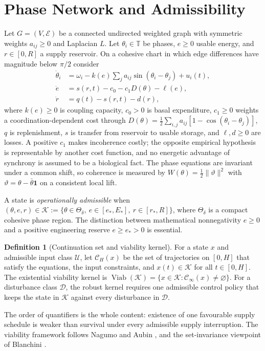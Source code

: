 \documentclass[11pt,notitlepage]{report}
\theoremstyle{definition}
\newtheorem{definition}[theorem]{Definition}
\theoremstyle{remark}
\newcommand{\K}{\mathcal K}
\newcommand{\one}{\mathbf 1}
\begin{document}
\section{Phase Network and Admissibility}
Let $G=(V,\mathcal E)$ be a connected undirected weighted graph with symmetric weights $a_{ij}\ge0$ and Laplacian $L$. Let $\theta_i\in\mathbb T$ be phases, $e\ge0$ usable energy, and $r\in[0,R]$ a supply reservoir. On a cohesive chart in which edge differences have magnitude below $\pi/2$ consider
\begin{align}
\dot\theta_i&=\omega_i-k(e)\sum_j a_{ij}\sin(\theta_i-\theta_j)+u_i(t),\label{eq:phase}\\
\dot e&=s(r,t)-c_0-c_1D(\theta)-\ell(e),\label{eq:energy}\\
\dot r&=q(t)-s(r,t)-d(r),\label{eq:reservoir}
\end{align}
where $k(e)\ge0$ is coupling capacity, $c_0>0$ is basal expenditure, $c_1\ge0$ weights a coordination-dependent cost through $D(\theta)=\tfrac12\sum_{i,j}a_{ij}[1-\cos(\theta_i-\theta_j)]$, $q$ is replenishment, $s$ is transfer from reservoir to usable storage, and $\ell,d\ge0$ are losses. A positive $c_1$ makes incoherence costly; the opposite empirical hypothesis is representable by another cost function, and no energetic advantage of synchrony is assumed to be a biological fact. The phase equations are invariant under a common shift, so coherence is measured by $W(\theta)=\tfrac12\|\vartheta\|^2$ with $\vartheta=\theta-\bar\theta\one$ on a consistent local lift.

A state is \emph{operationally admissible} when $(\theta,e,r)\in\K:=\{\theta\in\Theta_\delta,\ e\in[e_*,E_*],\ r\in[r_*,R]\}$, where $\Theta_\delta$ is a compact cohesive phase region. The distinction between mathematical nonnegativity $e\ge0$ and a positive engineering reserve $e\ge e_*>0$ is essential.

\begin{definition}[Continuation set and viability kernel]
For a state $x$ and admissible input class $\mathcal U$, let $\mathcal C_H(x)$ be the set of trajectories on $[0,H]$ that satisfy the equations, the input constraints, and $x(t)\in\K$ for all $t\in[0,H]$. The existential viability kernel is $\operatorname{Viab}(\K)=\{x\in\K:\mathcal C_\infty(x)\neq\varnothing\}$. For a disturbance class $\mathcal D$, the robust kernel requires one admissible control policy that keeps the state in $\K$ against every disturbance in $\mathcal D$.
\end{definition}
The order of quantifiers is the whole content: existence of one favourable supply schedule is weaker than survival under every admissible supply interruption. The viability framework follows Nagumo \cite{nagumo1942} and Aubin \cite{aubin1991}, and the set-invariance viewpoint of Blanchini \cite{blanchini1999}.
\end{document}

